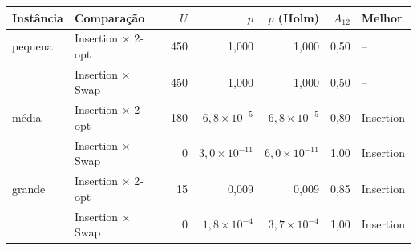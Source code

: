 \begin{tabular}{llrrrrl}
\toprule
Instância & Comparação & $U$ & $p$ & $p$ (Holm) & $A_{12}$ & Melhor \\
\midrule
pequena & Insertion $\times$ 2-opt & 450 & 1,000 & 1,000 & 0,50 & -- \\
 & Insertion $\times$ Swap & 450 & 1,000 & 1,000 & 0,50 & -- \\
\midrule
média & Insertion $\times$ 2-opt & 180 & $6,8\times10^{-5}$ & $6,8\times10^{-5}$ & 0,80 & Insertion \\
 & Insertion $\times$ Swap & 0 & $3,0\times10^{-11}$ & $6,0\times10^{-11}$ & 1,00 & Insertion \\
\midrule
grande & Insertion $\times$ 2-opt & 15 & 0,009 & 0,009 & 0,85 & Insertion \\
 & Insertion $\times$ Swap & 0 & $1,8\times10^{-4}$ & $3,7\times10^{-4}$ & 1,00 & Insertion \\
\bottomrule
\end{tabular}
